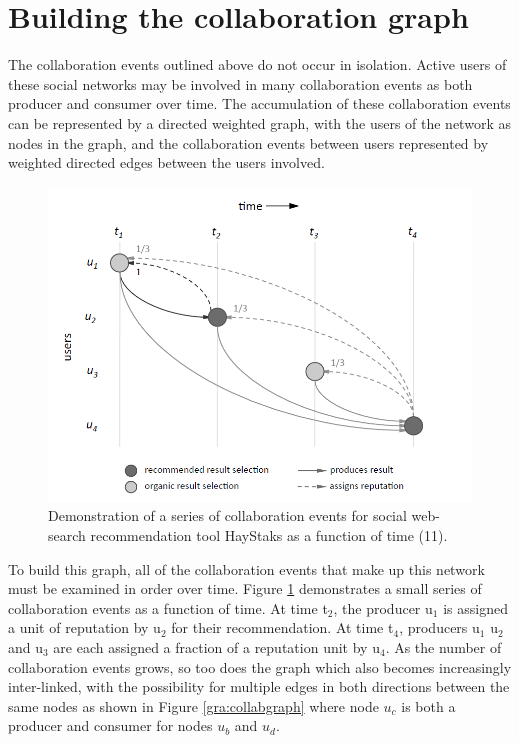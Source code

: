 \documentclass[]{final_report}
\begin{document}
\section{Building the collaboration graph}

The collaboration events outlined above do not occur in isolation. Active users of these social networks may be involved in many collaboration events as both producer and consumer over time. The accumulation of these collaboration events can be represented by a directed weighted graph, with the users of the network as nodes in the graph, and the collaboration events between users represented by weighted directed edges between the users involved.

\begin{figure}[ht!]
\centering
\includegraphics[width=130mm]{chap3/collabeventstime.PNG}
\caption{Demonstration of a series of collaboration events for social web-search recommendation tool HayStaks as a function of time (11).}
\label{gra:collabtime}
\end{figure}

To build this graph, all of the collaboration events that make up this network must be examined in order over time. Figure \ref{gra:collabtime} demonstrates a small series of collaboration events as a function of time. At time t$_{2}$, the producer u$_{1}$ is assigned a unit of reputation by u$_{2}$ for their recommendation. At time t$_{4}$, producers u$_{1}$ u$_{2}$ and u$_{3}$ are each assigned a fraction of a reputation unit by u$_{4}$. As the number of collaboration events grows, so too does the graph which also becomes increasingly inter-linked, with the possibility for multiple edges in both directions between the same nodes as shown in Figure \ref{gra:collabgraph} where node $u_{c}$ is both a producer and consumer for nodes $u_{b}$ and $u_{d}$.
\end{document}
